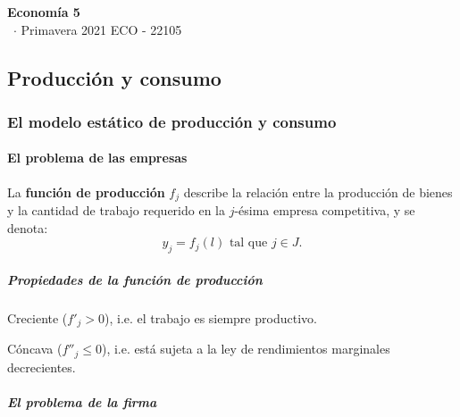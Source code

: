 \documentclass[8pt,a4paper]{extarticle}
\renewcommand{\csClass}{Economía 5}
\renewcommand{\csClassCode}{ECO - 22105}
\renewcommand{\csTerm}{Primavera 2021}
\begin{document}
\begin{titlepage}
    \begin{center}
	\vspace*{1cm}
	\Huge
        \textbf{\csClass}
	\vspace{0.5cm} \\
	\Large
        \cs\ $\cdot$ \csTerm
        \vfill
        \csAuthorName
	\vspace{0.8cm}
        \csClassCode\\
        \csSchool     
    \end{center}
\end{titlepage}

\begin{multicols}{3}
\setcounter{page}{1}

\part{Producción y consumo}

\section{El modelo estático de producción y consumo}

\subsection{El problema de las empresas}

\begin{boxdef}
	La \textbf{función de producción} $f_j$ describe la relación entre la producción de bienes y la cantidad de trabajo requerido en la $j$-ésima empresa competitiva, y se denota:
	\[
		y_j = f_j(l) \text{ tal que } j \in J
	.\]
\end{boxdef}

\subsubsection*{Propiedades de la función de producción}

\begin{eqlist}
\item Creciente ($f'_j > 0$), i.e. el trabajo es siempre productivo.
\item Cóncava ($f''_j \le 0$), i.e. está sujeta a la ley de rendimientos marginales decrecientes.
\end{eqlist}

\subsubsection*{El problema de la firma}


\end{multicols}
\end{document}
